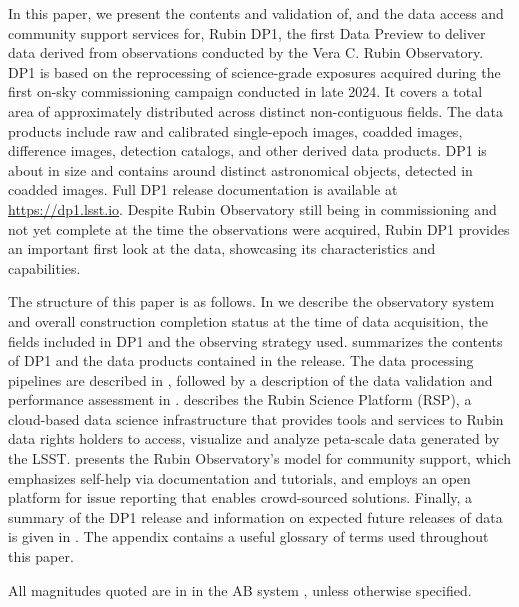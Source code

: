 In this paper, we present the contents and validation of, and the data access and community support services for, Rubin \gls{DP1}, the first Data Preview to deliver data derived from observations conducted by the Vera C. Rubin Observatory.
\gls{DP1} is based on the reprocessing of \nexposures science-grade exposures acquired 
during the first on-sky commissioning campaign conducted in late 2024.
It covers a  total area of approximately \totalarea distributed across \nfields distinct non-contiguous fields.
The data products include raw and calibrated single-\gls{epoch} images, coadded images, difference images, detection catalogs, and other derived data products.
\gls{DP1} is about \sizeinbytes in size and contains around \nobjects distinct astronomical objects, detected in \ndeepcoadds coadded images.
Full \gls{DP1} release documentation is available at \url{https://dp1.lsst.io}.
Despite Rubin Observatory still being in commissioning and not yet complete at the time the observations were acquired, Rubin \gls{DP1} provides an important first look at the data, showcasing its characteristics and capabilities.

The structure of this paper is as follows.
In  we describe the observatory system and overall construction completion status at the time of data acquisition, the \nfields fields included in \gls{DP1} and the observing strategy used.
 summarizes the contents of \gls{DP1} and the data products contained in the release.
The data processing pipelines are described in , followed by a description of the data validation and performance assessment in .
 describes the Rubin \gls{Science Platform} (RSP), a \gls{cloud}-based data science infrastructure that provides tools and services to Rubin data rights holders to access, visualize and analyze peta-scale data generated by the \gls{LSST}.
 presents the Rubin Observatory's model for community support, which emphasizes self-help via documentation and tutorials, and employs an open platform for issue reporting that enables crowd-sourced solutions.
Finally, a summary of the \gls{DP1} release and information on expected future releases of data is given in .
The appendix contains a useful glossary of terms used throughout this paper.

All magnitudes quoted are in
in the AB system \citep{1983ApJ...266..713O}, unless otherwise specified.

